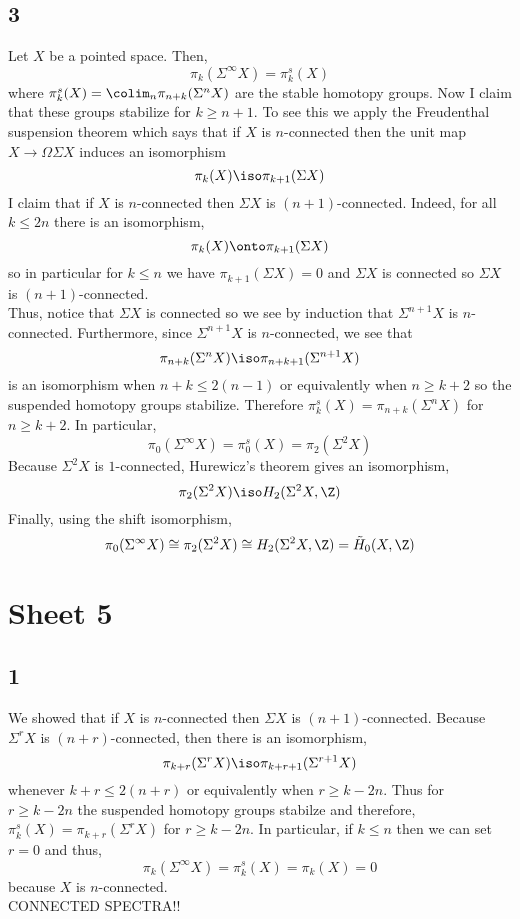 \documentclass[12pt]{extarticle}
\begin{document}
\subsection*{3}

Let $X$ be a pointed space. Then,
\[ \pi_k(\Sigma^\infty X) = \pi_k^{s}(X) \]
where $\pi_k^{s}(X) = \colim_n \pi_{n+k}(\Sigma^n X)$ are the stable homotopy groups. Now I claim that these groups stabilize for $k \ge n+1$. To see this we apply the Freudenthal suspension theorem which says that if $X$ is $n$-connected then the unit map $X \to \Omega \Sigma X$ induces an isomorphism 
\[ \pi_k(X) \iso \pi_{k+1}(\Sigma X) \]
I claim that if $X$ is $n$-connected then $\Sigma X$ is $(n+1)$-connected. 
Indeed, for all $k \le 2n$ there is an isomorphism,
\[ \pi_k(X) \onto \pi_{k+1}(\Sigma X) \]
so in particular for $k \le n$ we have $\pi_{k+1}(\Sigma X) = 0$ and $\Sigma X$ is connected so $\Sigma X$ is $(n+1)$-connected.
\bigskip\\
Thus, notice that $\Sigma X$ is connected so we see by induction that $\Sigma^{n+1} X$ is $n$-connected. Furthermore, since $\Sigma^{n+1} X$ is $n$-connected, we see that
\[ \pi_{n+k}(\Sigma^{n} X) \iso \pi_{n+k+1}(\Sigma^{n+1} X) \]
is an isomorphism when $n + k \le 2(n-1)$ or equivalently when $n \ge k + 2$ so the suspended homotopy groups stabilize. Therefore $\pi_k^{s}(X) = \pi_{n+k}(\Sigma^n X)$ for $n \ge k + 2$. In particular,
\[ \pi_0(\Sigma^\infty X) = \pi_0^s(X) = \pi_2(\Sigma^2 X) \]
Because $\Sigma^2 X$ is $1$-connected, Hurewicz's theorem gives an isomorphism,
\[ \pi_2(\Sigma^2 X) \iso H_2(\Sigma^2 X, \Z) \]
Finally, using the shift isomorphism,
\[ \pi_0(\Sigma^\infty X) \cong \pi_2(\Sigma^2 X) \cong H_2(\Sigma^2 X, \Z) = \tilde{H}_0(X, \Z) \]

\section{Sheet 5}

\subsection*{1}

We showed that if $X$ is $n$-connected then $\Sigma X$ is $(n+1)$-connected. Because $\Sigma^r X$ is $(n+r)$-connected, then there is an isomorphism,
\[ \pi_{k + r}(\Sigma^r X) \iso \pi_{k + r + 1}(\Sigma^{r+1} X) \]
whenever $k + r \le 2(n + r)$ or equivalently when $r \ge k - 2n$. Thus for $r \ge k - 2n$ the suspended homotopy groups stabilze and therefore, $\pi_k^s(X) = \pi_{k + r}(\Sigma^r X)$ for $r \ge k - 2n$. In particular, if $k \le n$ then we can set $r = 0$ and thus,
\[ \pi_k(\Sigma^\infty X) = \pi^s_k(X) = \pi_{k}(X) = 0 \]
because $X$ is $n$-connected.
\bigskip\\
CONNECTED SPECTRA!!
\end{document}
